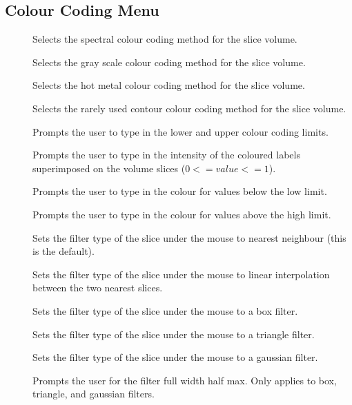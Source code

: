 \subsection{Colour Coding Menu}

\begin{description}
\item[]  Selects the spectral colour coding
                                          method for the slice volume.
\item[]  Selects the gray scale colour coding
                                          method for the slice volume.
\item[]  Selects the hot metal colour coding
                                          method for the slice volume.
\item[]  Selects the rarely used contour
                                    colour coding method for the slice volume.
\item[]  Prompts the user to type in the lower
                                    and upper colour coding limits.
\item[]  Prompts the user to type in the
                      intensity of the coloured labels superimposed on the 
                      volume slices ($0 <= value <= 1$).
\item[]  Prompts the user to type in
                                   the colour for values below the low limit.
\item[]  Prompts the user to type in
                                   the colour for values above the high limit.
\item[]  Sets the filter type of
                       the slice under the mouse to nearest neighbour (this is
                       the default).
\item[]  Sets the filter type of
                       the slice under the mouse to linear interpolation
                       between the two nearest slices.
\item[]  Sets the filter type of
                       the slice under the mouse to a box filter.
\item[]  Sets the filter type of
                       the slice under the mouse to a triangle filter.
\item[]  Sets the filter type of
                       the slice under the mouse to a gaussian filter.
\item[]  Prompts the user for
                      the filter full width half max.  Only applies to box,
                      triangle, and gaussian filters.
\end{description}

